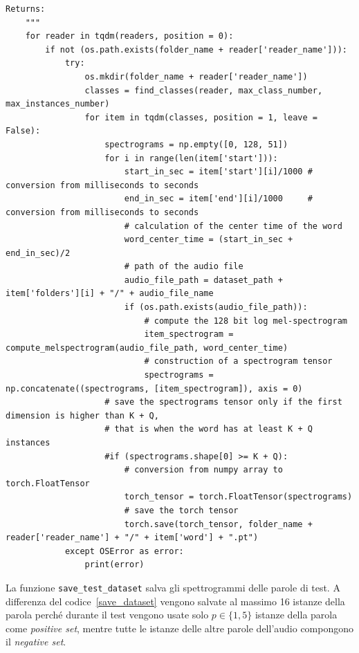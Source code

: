 \documentclass[12pt,a4paper,titlepage]{article}
\begin{document}
\begin{lstlisting}[language=iPython,firstnumber=164, caption=Funzione \texttt{save\_dataset}, label=save_dataset,captionpos=b]
    Returns:
    """
    for reader in tqdm(readers, position = 0):
        if not (os.path.exists(folder_name + reader['reader_name'])):
            try:
                os.mkdir(folder_name + reader['reader_name'])
                classes = find_classes(reader, max_class_number, max_instances_number)
                for item in tqdm(classes, position = 1, leave = False):
                    spectrograms = np.empty([0, 128, 51])
                    for i in range(len(item['start'])):
                        start_in_sec = item['start'][i]/1000 # conversion from milliseconds to seconds
                        end_in_sec = item['end'][i]/1000     # conversion from milliseconds to seconds
                        # calculation of the center time of the word
                        word_center_time = (start_in_sec + end_in_sec)/2
                        # path of the audio file
                        audio_file_path = dataset_path + item['folders'][i] + "/" + audio_file_name
                        if (os.path.exists(audio_file_path)):
                            # compute the 128 bit log mel-spectrogram
                            item_spectrogram = compute_melspectrogram(audio_file_path, word_center_time)
                            # construction of a spectrogram tensor
                            spectrograms = np.concatenate((spectrograms, [item_spectrogram]), axis = 0)
                    # save the spectrograms tensor only if the first dimension is higher than K + Q, 
                    # that is when the word has at least K + Q instances
                    #if (spectrograms.shape[0] >= K + Q):
                        # conversion from numpy array to torch.FloatTensor
                        torch_tensor = torch.FloatTensor(spectrograms)
                        # save the torch tensor
                        torch.save(torch_tensor, folder_name + reader['reader_name'] + "/" + item['word'] + ".pt")
            except OSError as error:
                print(error)   
\end{lstlisting}

La funzione \texttt{save\_test\_dataset} salva gli spettrogrammi delle parole di test. A differenza del codice~\ref{save_dataset} vengono salvate al massimo 16 istanze della parola perché durante il test vengono usate solo $p \in \{1, 5\}$ istanze della parola come \emph{positive set}, mentre tutte le istanze delle altre parole dell'audio compongono il \emph{negative set}.
\end{document}

